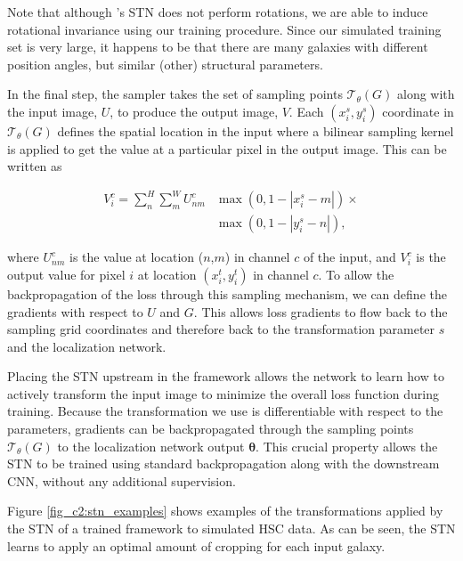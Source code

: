 Note that although \gampen{}'s STN does not perform rotations, we are able to induce rotational invariance using our training procedure.  Since our simulated training set is very large, it happens to be that there are many galaxies with different position angles, but similar (other) structural parameters.

In the final step, the sampler takes the set of sampling points $\mathcal{T}_\theta(G)$ along with the input image, $U$, to produce the output image, $V$. Each $ \left(x_i^s,y_i^s\right)$ coordinate in $\mathcal{T}_\theta(G)$ defines the spatial location in the input where a bilinear sampling kernel is applied to get the value at a particular pixel in the output image. This can be written as 

\begin{equation}
\begin{split}
V_{i}^{c}=\sum_{n}^{H} \sum_{m}^{W} U_{n m}^{c} & \max \left(0,1-\left|x_{i}^{s}-m\right|\right) \times \\ & \max \left(0,1-\left|y_{i}^{s}-n\right|\right) , 
\end{split}
\label{eq_c2:smapling_v}
\end{equation}

\noindent
where $U_{n m}^{c}$ is the value at location ($n$,$m$) in channel $c$ of the input, and $V_{i}^{c}$ is the output value for pixel $i$ at location $\left(x_i^t,y_i^t\right)$ in channel $c$. To allow the backpropagation of the loss through this sampling mechanism, we can define the gradients with respect to $U$ and $G$. This allows loss gradients to flow back to the sampling grid coordinates and therefore back to the transformation parameter $s$ and the localization network.

Placing the STN upstream in the \gampen{} framework allows the network to learn how to actively transform the input image to minimize the overall loss function during training. Because the transformation we use is differentiable with respect to the parameters, gradients can be backpropagated through the sampling points $\mathcal{T}_\theta(G)$ to the localization network output $\boldsymbol{\theta}$. This crucial property allows the STN to be trained using standard backpropagation along with the downstream CNN, without any additional supervision. 

Figure \ref{fig_c2:stn_examples} shows examples of the transformations applied by the STN of a trained \gampen{} framework to simulated HSC data. As can be seen, the STN learns to apply an optimal amount of cropping for each input galaxy. 

